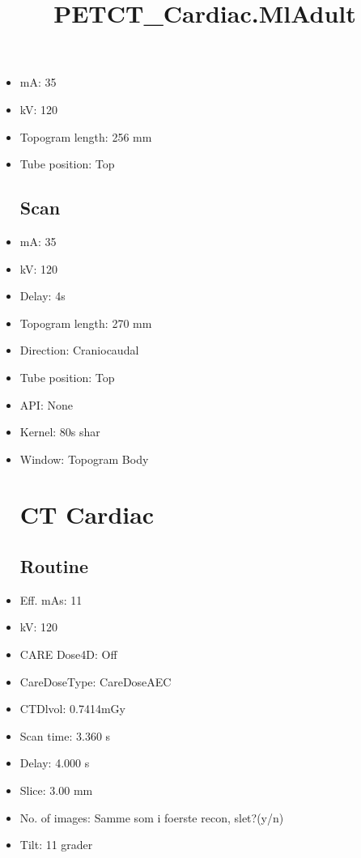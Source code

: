\documentclass[12pt]{article}
\title{PETCT\_Cardiac.MlAdult}
\begin{document}
\maketitle
\newpage
\tableofcontents
\newpage
{}


\begin{itemize}\section{Topogram}
\subsection{Routine}
\item mA: 35\item kV: 120\item Topogram length: 256 mm\item Tube position: Top
\subsection{Scan}\item mA: 35\item kV: 120\item Delay: 4s\item Topogram length: 270 mm\item Direction: Craniocaudal\item Tube position: Top\item API: None\item Kernel: 80s shar\item Window: Topogram Body
\section{CT Cardiac}
\subsection{Routine}
\item Eff. mAs: 11\item kV: 120\item CARE Dose4D: Off\item CareDoseType: CareDoseAEC\item CTDlvol: 0.7414mGy\item Scan time: 3.360 s\item Delay: 4.000 s\item Slice: 3.00 mm\item No. of images: Samme som i foerste recon, slet?(y/n)\item Tilt: 11 grader

\end{itemize}
\end{document}
